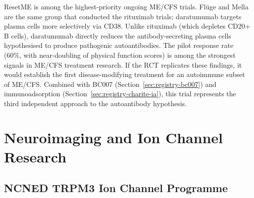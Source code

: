 ResetME is among the highest-priority ongoing ME/CFS trials.  Fl\"{u}ge and
Mella are the same group that conducted the rituximab trials; daratumumab
targets plasma cells more selectively via CD38.  Unlike rituximab (which
depletes CD20+ B cells), daratumumab directly reduces the antibody-secreting
plasma cells hypothesised to produce pathogenic autoantibodies.  The pilot
response rate (60\%, with near-doubling of physical function scores) is
among the strongest signals in ME/CFS treatment research.  If the RCT
replicates these findings, it would establish the first disease-modifying
treatment for an autoimmune subset of ME/CFS.  Combined with BC007
(Section~\ref{sec:registry-bc007}) and immunoadsorption
(Section~\ref{sec:registry-charite-ia}), this trial represents the third
independent approach to the autoantibody hypothesis.

\section{Neuroimaging and Ion Channel Research}
\label{sec:registry-neuro}

\subsection{NCNED TRPM3 Ion Channel Programme}
\label{sec:registry-ncned-trpm3}

